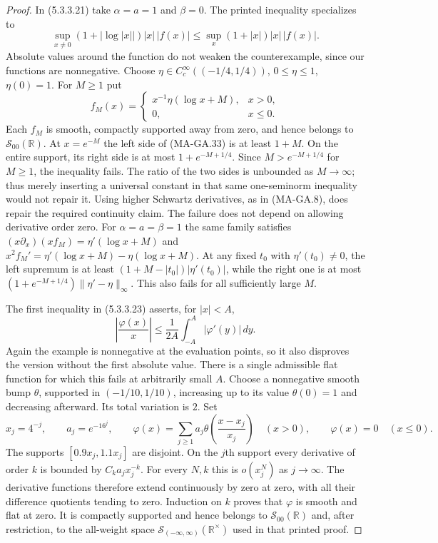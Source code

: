 \begin{proof}
In (5.3.3.21) take $\alpha=a=1$ and $\beta=0$.
The printed inequality specializes to
\[
 \sup_{x\ne0}(1+|\log|x||)|x|\,|f(x)|
       \leq \sup_x(1+|x|)|x|\,|f(x)|.
 \tag{MA-GA.33}
\]
Absolute values around the function do not weaken the
counterexample, since our functions are nonnegative.
Choose $\eta\in C_c^\infty((-1/4,1/4))$,
$0\leq\eta\leq1$, $\eta(0)=1$.  For $M\geq1$ put
\[
 f_M(x)=
 \begin{cases}
 x^{-1}\eta(\log x+M),&x>0,\\
 0,&x\leq0.
 \end{cases}
 \tag{MA-GA.34}
\]
Each $f_M$ is smooth, compactly supported away from zero,
and hence belongs to $\mathcal S_{00}(\mathbb R)$.
At $x=e^{-M}$ the left side of (MA-GA.33) is at least
$1+M$.  On the entire support, its right side is at most
$1+e^{-M+1/4}$.  Since $M>e^{-M+1/4}$ for $M\geq1$,
the inequality fails.  The ratio of the two sides is
unbounded as $M\to\infty$; thus merely inserting a
universal constant in that same one-seminorm inequality
would not repair it.  Using higher Schwartz derivatives,
as in (MA-GA.8), does repair the required continuity claim.
The failure does not depend on allowing derivative order
zero.  For $\alpha=a=\beta=1$ the same family satisfies
$(x\partial_x)(xf_M)=\eta'(\log x+M)$ and
$x^2f_M'=\eta'(\log x+M)-\eta(\log x+M)$.
At any fixed $t_0$ with $\eta'(t_0)\ne0$, the left
supremum is at least
$(1+M-|t_0|)|\eta'(t_0)|$, while the right one is at
most $(1+e^{-M+1/4})\|\eta'-\eta\|_\infty$.
This also fails for all sufficiently large $M$.

The first inequality in (5.3.3.23) asserts, for $|x|<A$,
\[
 \left|\frac{\varphi(x)}x\right|
       \leq\frac1{2A}\int_{-A}^{A}|\varphi'(y)|\,dy.
 \tag{MA-GA.35}
\]
Again the example is nonnegative at the evaluation points,
so it also disproves the version without the first absolute
value.  There is a single admissible flat function for which
this fails at arbitrarily small $A$.  Choose a nonnegative
smooth bump $\theta$, supported in $(-1/10,1/10)$,
increasing up to its value $\theta(0)=1$ and decreasing
afterward.  Its total variation is $2$.  Set
\[
 x_j=4^{-j},\qquad a_j=e^{-16^j},\qquad
 \varphi(x)=\sum_{j\geq1}a_j
                  \theta\!\left(\frac{x-x_j}{x_j}\right)
       \quad(x>0),\qquad \varphi(x)=0\quad(x\leq0).
 \tag{MA-GA.36}
\]
The supports $[0.9x_j,1.1x_j]$ are disjoint.  On the
$j$th support every derivative of order $k$ is bounded
by $C_k a_jx_j^{-k}$.  For every $N,k$ this is
$o(x_j^N)$ as $j\to\infty$.  The derivative functions
therefore extend continuously by zero at zero, with
all their difference quotients tending to zero.
Induction on $k$ proves that $\varphi$ is smooth and
flat at zero.  It is compactly supported and hence
belongs to $\mathcal S_{00}(\mathbb R)$ and, after
restriction, to the all-weight space
$\mathcal S_{(-\infty,\infty)}(\mathbb R^\times)$
used in that printed proof.


\end{proof}
